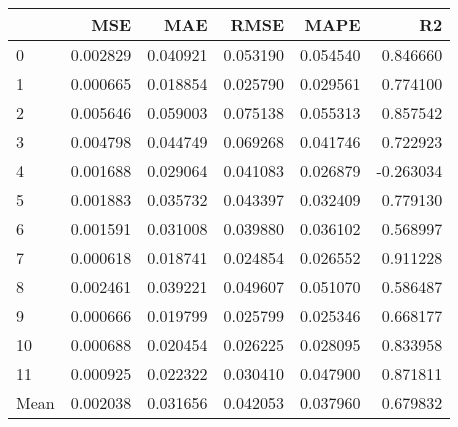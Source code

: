 \begin{tabular}{lrrrrr}
\toprule
 & MSE & MAE & RMSE & MAPE & R2 \\
\midrule
0 & 0.002829 & 0.040921 & 0.053190 & 0.054540 & 0.846660 \\
1 & 0.000665 & 0.018854 & 0.025790 & 0.029561 & 0.774100 \\
2 & 0.005646 & 0.059003 & 0.075138 & 0.055313 & 0.857542 \\
3 & 0.004798 & 0.044749 & 0.069268 & 0.041746 & 0.722923 \\
4 & 0.001688 & 0.029064 & 0.041083 & 0.026879 & -0.263034 \\
5 & 0.001883 & 0.035732 & 0.043397 & 0.032409 & 0.779130 \\
6 & 0.001591 & 0.031008 & 0.039880 & 0.036102 & 0.568997 \\
7 & 0.000618 & 0.018741 & 0.024854 & 0.026552 & 0.911228 \\
8 & 0.002461 & 0.039221 & 0.049607 & 0.051070 & 0.586487 \\
9 & 0.000666 & 0.019799 & 0.025799 & 0.025346 & 0.668177 \\
10 & 0.000688 & 0.020454 & 0.026225 & 0.028095 & 0.833958 \\
11 & 0.000925 & 0.022322 & 0.030410 & 0.047900 & 0.871811 \\
Mean & 0.002038 & 0.031656 & 0.042053 & 0.037960 & 0.679832 \\
\bottomrule
\end{tabular}
